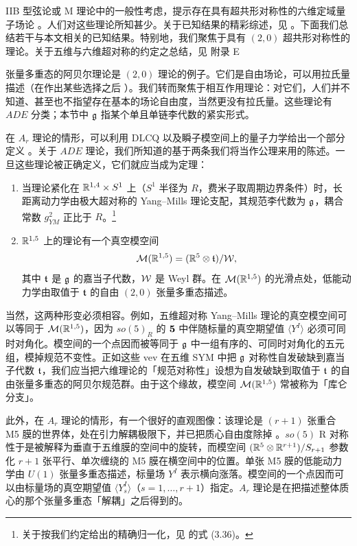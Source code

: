 IIB 型弦论或 M 理论中的一般性考虑，提示存在具有超共形对称性的六维定域量子场论 \cite{Witten:1995zh,Strominger:1996ac,Witten:1995em}。人们对这些理论所知甚少。关于已知结果的精彩综述，见 \cite{Seiberg:1997ax,Witten:2009at}。下面我们总结若干与本文相关的已知结果。特别地，我们聚焦于具有 $(2,0)$ 超共形对称性的理论。关于五维与六维超对称的约定之总结，见
附录 E%

张量多重态的阿贝尔理论是 $(2,0)$ 理论的例子。它们是自由场论，可以用拉氏量描述（在作出某些选择之后 \cite{Belov:2006jd}）。我们转而聚焦于相互作用理论：对它们，人们并不知道、甚至也不指望存在基本的场论自由度，当然更没有拉氏量。这些理论有 $ADE$ 分类；本节中 $\mathfrak{g}$ 指某个单且单链李代数的紧实形式。

在 $A_r$ 理论的情形，可以利用 DLCQ 以及瞬子模空间上的量子力学给出一个部分定义 \cite{Aharony:1997th,Aharony:1997an}。关于 $ADE$ 理论，我们所知道的基于两条我们将当作公理来用的陈述。一旦这些理论被正确定义，它们就应当成为定理：

\begin{enumerate}

\item 当理论紧化在 $\mathbb{R}^{1,4}\times S^1$ 上（$S^1$ 半径为 $R$，费米子取周期边界条件）时，长距离动力学由极大超对称的 Yang--Mills 理论支配，其规范李代数为 $\mathfrak{g}$，耦合常数 $g^2_{YM}$ 正比于 $R$。\footnote{关于按我们约定给出的精确归一化，见 \cite{Gaiotto:2009hg} 的式 (3.36)。}

\item $\mathbb{R}^{1,5}$ 上的理论有一个真空模空间
\begin{equation}
\mathcal{M}(\mathbb{R}^{1,5}) = (\mathbb{R}^5\otimes \mathfrak{t})/\mathcal{W},
\end{equation}
其中 $\mathfrak{t}$ 是 $\mathfrak{g}$ 的嘉当子代数，$\mathcal{W}$ 是 Weyl 群。在 $\mathcal{M}(\mathbb{R}^{1,5})$ 的光滑点处，低能动力学由取值于 $\mathfrak{t}$ 的自由 $(2,0)$ 张量多重态描述。
\end{enumerate}

当然，这两种形变必须相容。例如，五维超对称 Yang--Mills 理论的真空模空间可以等同于 $\mathcal{M}(\mathbb{R}^{1,5})$，因为 $so(5)_R$ 的 ${\bf 5}$ 中伴随标量的真空期望值 $\langle Y^I \rangle$ 必须可同时对角化。模空间的一个点因而被等同于 $\mathfrak{g}$ 中一组有序的、可同时对角化的五元组，模掉规范不变性。正如这些 vev 在五维 SYM 中把 $\mathfrak{g}$ 对称性自发破缺到嘉当子代数 $\mathfrak{t}$，我们应当把六维理论的「规范对称性」设想为自发破缺到取值于 $\mathfrak{t}$ 的自由张量多重态的阿贝尔规范群。由于这个缘故，模空间 $\mathcal{M}(\mathbb{R}^{1,5})$ 常被称为「库仑分支」。

此外，在 $A_r$ 理论的情形，有一个很好的直观图像：该理论是 $(r+1)$ 张重合 M5 膜的世界体，处在引力解耦极限下，并已把质心自由度除掉 \cite{Strominger:1996ac}。$so(5)$ R 对称性于是被解释为垂直于五维膜的空间中的旋转，而模空间 $(\mathbb{R}^5 \otimes \mathbb{R}^{r+1})/S_{r+1}$ 参数化 $r+1$ 张平行、单次缠绕的 M5 膜在横空间中的位置。单张 M5 膜的低能动力学由 $U(1)$ 张量多重态描述，标量场 $Y^I$ 表示横向涨落。模空间的一个点因而可以由标量场的真空期望值 $\langle Y^I_s \rangle$（$s=1,\dots, r+1$）指定。$A_r$ 理论是在把描述整体质心的那个张量多重态「解耦」之后得到的。

